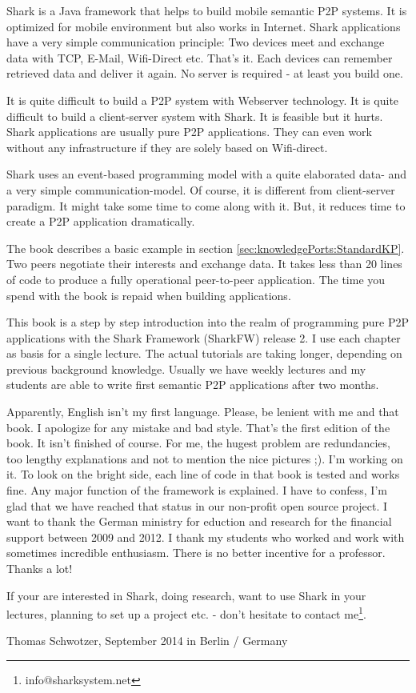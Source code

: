 Shark is a Java framework that helps to build mobile semantic P2P systems. It is optimized for mobile environment but also works in Internet. Shark applications have a very simple communication principle: Two devices meet and exchange data with TCP, E-Mail, Wifi-Direct etc. That's it. Each devices can remember retrieved data and deliver it again. No server is required - at least you build one.

It is quite difficult to build a P2P system with Webserver technology. It is quite difficult to build a client-server system with Shark. It is feasible but it hurts. Shark applications are usually pure P2P applications. They can even work without any infrastructure if they are solely based on Wifi-direct.

Shark uses an event-based programming model with a quite elaborated data- and a very simple communication-model. Of course, it is different from client-server paradigm. It might take some time to come along with it. But, it reduces time to create a P2P application dramatically.

The book describes a basic example in section \ref{sec:knowledgePorts:StandardKP}. Two peers negotiate their interests and exchange data. It takes less than 20 lines of code to produce a fully operational peer-to-peer application. The time you spend with the book is repaid when building applications.

This book is a step by step introduction into the realm of programming pure
P2P applications with the Shark Framework (SharkFW) release 2. I use each
chapter as basis for a single lecture. The actual tutorials are taking longer, depending on previous background knowledge. Usually we have weekly lectures and my students are able to write first semantic P2P applications after two months.

Apparently, English isn't my first language. Please, be lenient with me and that book. I apologize for any mistake and bad style. That's the first edition of the book. It isn't finished of course. For me, the hugest problem are redundancies, too lengthy explanations and not to mention the nice pictures ;). I'm working on it. To look on the bright side, each line of code in that book is tested and works fine. Any major function of the framework is explained. I have to confess, I'm glad that we have reached that status in our non-profit open source project.
I want to thank the German ministry for eduction and research for the financial support between 2009 and 2012. I thank my students who worked and work with sometimes incredible enthusiasm. There is no better incentive for a professor. Thanks a lot!

If your are interested in Shark, doing research, want to use Shark in your lectures, planning to set up a project etc. - don't hesitate to contact me\footnote{info@sharksystem.net}.

\vspace{1,5cm}

Thomas Schwotzer, September 2014 in Berlin / Germany

